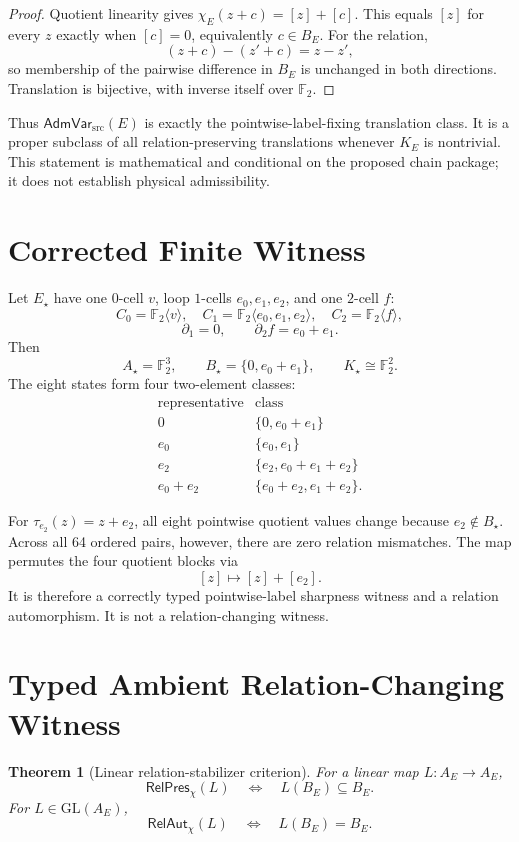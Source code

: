 \documentclass[11pt]{article}
\newtheorem{theorem}{Theorem}
\newcommand{\Ftwo}{\mathbb F_2}
\newcommand{\AdmVar}{\mathsf{AdmVar}_{\mathrm{src}}}
\newcommand{\RelPres}{\mathsf{RelPres}_{\chi}}
\newcommand{\RelAut}{\mathsf{RelAut}_{\chi}}
\begin{document}
\begin{proof}
Quotient linearity gives
\(\chi_E(z+c)=[z]+[c]\). This equals \([z]\) for every \(z\) exactly when
\([c]=0\), equivalently \(c\in B_E\). For the relation,
\[
(z+c)-(z'+c)=z-z',
\]
so membership of the pairwise difference in \(B_E\) is unchanged in both
directions. Translation is bijective, with inverse itself over \(\Ftwo\).
\end{proof}

Thus \(\AdmVar(E)\) is exactly the pointwise-label-fixing translation class.
It is a proper subclass of all relation-preserving translations whenever
\(K_E\) is nontrivial. This statement is mathematical and conditional on the
proposed chain package; it does not establish physical admissibility.

\section{Corrected Finite Witness}

Let \(E_\star\) have one \(0\)-cell \(v\), loop \(1\)-cells
\(e_0,e_1,e_2\), and one \(2\)-cell \(f\):
\[
C_0=\Ftwo\langle v\rangle,\quad
C_1=\Ftwo\langle e_0,e_1,e_2\rangle,\quad
C_2=\Ftwo\langle f\rangle,
\]
\[
\partial_1=0,\qquad \partial_2f=e_0+e_1.
\]
Then
\[
A_\star=\Ftwo^3,\qquad
B_\star=\{0,e_0+e_1\},\qquad
K_\star\cong\Ftwo^2.
\]
The eight states form four two-element classes:
\[
\begin{array}{c|c}
\text{representative}&\text{class}\\\hline
0&\{0,e_0+e_1\}\\
e_0&\{e_0,e_1\}\\
e_2&\{e_2,e_0+e_1+e_2\}\\
e_0+e_2&\{e_0+e_2,e_1+e_2\}.
\end{array}
\]

For \(\tau_{e_2}(z)=z+e_2\), all eight pointwise quotient values change
because \(e_2\notin B_\star\). Across all 64 ordered pairs, however, there
are zero relation mismatches. The map permutes the four quotient blocks via
\[
[z]\longmapsto[z]+[e_2].
\]
It is therefore a correctly typed pointwise-label sharpness witness and a
relation automorphism. It is not a relation-changing witness.

\section{Typed Ambient Relation-Changing Witness}

\begin{theorem}[Linear relation-stabilizer criterion]
For a linear map \(L:A_E\to A_E\),
\[
\RelPres(L)\quad\Longleftrightarrow\quad L(B_E)\subseteq B_E.
\]
For \(L\in\mathrm{GL}(A_E)\),
\[
\RelAut(L)\quad\Longleftrightarrow\quad L(B_E)=B_E.
\]
\end{theorem}
\end{document}
